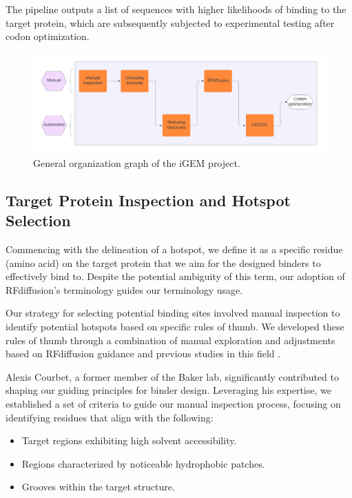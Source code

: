 \documentclass[11pt,a4paper]{article}
\begin{document}
The pipeline outputs a list of sequences with higher likelihoods of binding to the target protein, which are subsequently subjected to experimental testing after codon optimization.

\begin{figure}[ht]
    \centering
    \includegraphics[width=\textwidth]{Figures/iGEM_project_general_organization_graph.pdf}
    \caption{General organization graph of the iGEM project.}
    \label{fig:organization_graph}
\end{figure}

\subsection{Target Protein Inspection and Hotspot Selection}

Commencing with the delineation of a hotspot, we define it as a specific residue (amino acid) on the target protein that we aim for the designed binders to effectively bind to. Despite the potential ambiguity of this term, our adoption of RFdiffusion's terminology guides our terminology usage.

Our strategy for selecting potential binding sites involved manual inspection to identify potential hotspots based on specific rules of thumb. We developed these rules of thumb through a combination of manual exploration and adjustments based on RFdiffusion guidance \cite{rfdiffusion_github} and previous studies in this field \cite{chen2013protein}.

Alexis Courbet, a former member of the Baker lab, significantly contributed to shaping our guiding principles for binder design. Leveraging his expertise, we established a set of criteria to guide our manual inspection process, focusing on identifying residues that align with the following:

\begin{itemize}
\item Target regions exhibiting high solvent accessibility.
\item Regions characterized by noticeable hydrophobic patches.
\item Grooves within the target structure.
\end{itemize}
\end{document}
